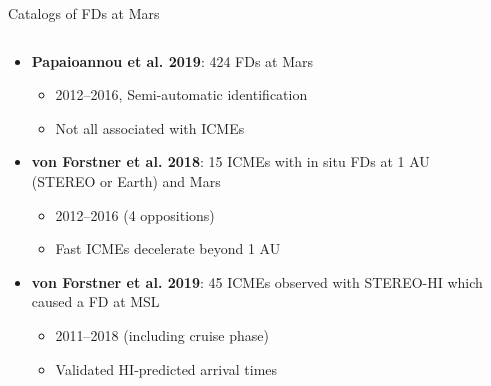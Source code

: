 \documentclass[10pt,aspectratio=169,usenames,dvipsnames]{beamer}
\begin{document}
\begin{frame}{Catalogs of FDs at Mars}
    \begin{columns}
    	\begin{column}{0.55\textwidth}
    		\begin{itemize}
                \item<1-> \textbf{Papaioannou et al. 2019}: 424 FDs at Mars
                    \begin{itemize}
                        \item 2012--2016, Semi-automatic identification
                        \item Not all associated with ICMEs
                    \end{itemize}
                \item<2-> \textbf{von Forstner et al. 2018}: 15 ICMEs with in situ FDs at 1 AU (STEREO or Earth) and Mars
                    \begin{itemize}
                        \item 2012--2016 (4 oppositions)
                        \item Fast ICMEs decelerate beyond 1 AU
                    \end{itemize}
    			\item<3-> \textbf{von Forstner et al. 2019}: 45 ICMEs observed with STEREO-HI which caused a FD at MSL
    				\begin{itemize}
                        \item 2011--2018 (including cruise phase)
                        \item Validated HI-predicted arrival times
    				\end{itemize}
    		\end{itemize}
    	\end{column}
    	\begin{column}{0.35\textwidth}
            \centering
\end{column}
\end{columns}
\end{frame}
\end{document}
